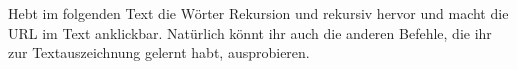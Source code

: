 Hebt im folgenden Text die Wörter \glqq{}Rekursion\grqq{} und \glqq{}rekursiv\grqq{} hervor und macht die URL im Text anklickbar. Natürlich könnt ihr auch die anderen Befehle, die ihr zur Textauszeichnung gelernt habt, ausprobieren. 


